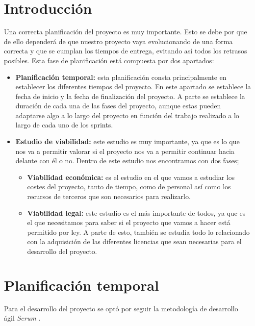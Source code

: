 
\section{Introducción}
Una correcta planificación del proyecto es muy importante. Esto se debe por que de ello dependerá de que nuestro proyecto vaya evolucionando de una forma correcta y que se cumplan los tiempos de entrega, evitando así todos los retrasos posibles. Esta fase de planificación está compuesta por dos apartados:

\begin{itemize}
	\tightlist
	\item
	\textbf{Planificación temporal:} esta planificación consta principalmente en establecer los diferentes tiempos del proyecto. En este apartado se establece la fecha de inicio y la fecha de finalización del proyecto. A parte se establece la duración de cada una de las fases del proyecto, aunque estas pueden adaptarse algo a lo largo del proyecto en función del trabajo realizado a lo largo de cada uno de los sprints.
	
	\item
	\textbf{Estudio de viabilidad:} este estudio es muy importante, ya que es lo que nos va a permitir valorar si el proyecto nos va a permitir continuar hacia delante con él o no. Dentro de este estudio nos encontramos con dos fases;
	\begin{itemize}
		\tightlist
		\item
		\textbf{Viabilidad económica:} es el estudio en el que vamos a estudiar los costes del proyecto, tanto de tiempo, como de personal así como los recursos de terceros que son necesarios para realizarlo.
		\item
		\textbf{Viabilidad legal:} este estudio es el más importante de todos, ya que es el que necesitamos para saber si el proyecto que vamos a hacer está permitido por ley. A parte de esto, también se estudia todo lo relacionado con la adquisición de las diferentes licencias que sean necesarias para el desarrollo del proyecto.
	\end{itemize}
\end{itemize}

\section{Planificación temporal}
Para el desarrollo del proyecto se optó por seguir la metodología de desarrollo ágil \textit{Scrum} \cite{scrum:wiki}.

